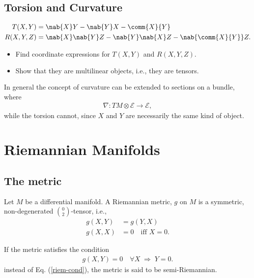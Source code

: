 \section{Torsion and Curvature}

\begin{align}
  T(X,Y) &= \nab{X}Y-\nab{Y}X-\comm{X}{Y}\\
  R(X,Y,Z) &= \nab{X}\nab{Y}Z -\nab{Y}\nab{X}Z -\nab{\comm{X}{Y}}Z.
\end{align}

\begin{Ebox}
  \begin{itemize}
  \item Find coordinate expressions for $T(X,Y)$ and $R(X,Y,Z)$.
  \item Show that they are multilinear objects, i.e., they are tensors.
  \end{itemize}
\end{Ebox}
\bigskip
\begin{infobox}[frametitle={NOTE}]
  In general the concept of curvature can be extended to sections on a bundle, where 
  \begin{align*}
    \nabla:TM\otimes\mathcal{E}\to\mathcal{E},
  \end{align*}
  while the torsion cannot, since $X$ and $Y$ are necessarily the same kind of object.
\end{infobox}




\chapter{Riemannian Manifolds}

\section{The metric}

\begin{Def}
  Let $M$ be a differential manifold. A {\sc Riemannian metric}, $g$ on $M$ is a symmetric, non-degenerated $\binom{0}{2}$-tensor, i.e.,
  \begin{align}
    g(X,Y) &= g(Y,X)\\
    g(X,X) &= 0\quad\text{iff }X=0.\label{riem-cond}
  \end{align}
\end{Def}

If the metric satisfies the condition
\begin{align}
  g(X,Y) = 0\quad \forall X\;\Rightarrow\; Y=0.\label{sriem-cond}
\end{align}
instead of Eq. (\ref{riem-cond}), the metric is said to be semi-Riemannian.

